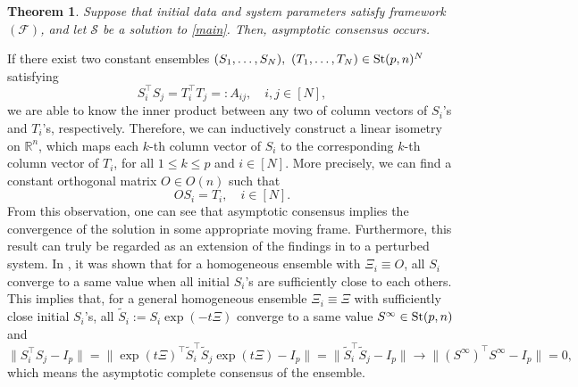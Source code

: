 \documentclass[11pt,reqno]{amsart}
\numberwithin{figure}{section}
\newcommand{\St}{  {\textup{St}}(p,n) }
\newtheorem{theorem}{Theorem}[section]
\begin{document}
\begin{theorem} \label{T1.1}
Suppose that initial data and system parameters satisfy framework $(\mathcal F)$, and let $\mathcal S$ be a solution to \eqref{main}. Then, asymptotic consensus occurs. 
\end{theorem}
If there exist two constant ensembles $(S_1,\ldots,S_N),~(T_1,\ldots,T_N)\in \St^N$ satisfying 
\[S_i^\top S_j=T_i^\top T_j=:A_{ij},\quad i,j\in [N], \]
we are able to know the inner product between any two of column vectors of $S_i$'s and $T_i$'s, respectively. 
Therefore, we can inductively construct a linear isometry on $\mathbb{R}^n$, which maps each $k$-th column vector of $S_i$ to the corresponding $k$-th column vector of $T_i$, for all $1\leq k\leq p$ and $i\in [N]$. More precisely, we can find a constant orthogonal matrix $O\in O(n)$ such that 
\[OS_i=T_i,\quad i\in [N]. \]	
From this observation, one can see that asymptotic consensus implies the convergence of the solution in some appropriate moving frame. Furthermore, this result can truly be regarded as an extension of the findings in \cite{HKK22} to a perturbed system. In \cite{HKK22}, it was shown that for a homogeneous ensemble with $\Xi_i\equiv O$, all $S_i$ converge to a same value  when all initial $S_i$'s are sufficiently close to each others. This implies that, for a general homogeneous ensemble $\Xi_i\equiv \Xi$ with sufficiently close initial $S_i$'s, all $\tilde{S}_i:=S_i\exp(-t\Xi)$ converge to a same value $S^\infty\in \St$ and 
\[\|S_i^\top S_j-I_p \|=\|\exp(t\Xi)^\top\tilde{S}_i^\top\tilde{S}_j\exp(t\Xi)-I_p \|=\|\tilde{S}_i^\top\tilde{S}_j-I_p \|\to \|(S^\infty)^\top S^\infty-I_p\|=0,  \]
which means the asymptotic complete consensus of the ensemble.
\end{document}
